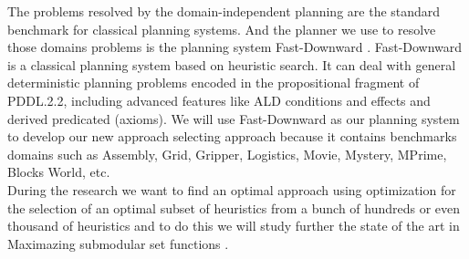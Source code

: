 \documentclass[a4paper,12pt]{article}
\begin{document}
The problems resolved by the domain-independent planning are the standard benchmark for classical planning systems. And the planner we use to resolve those domains problems is the planning system Fast-Downward \citep{helmert2006fast}. Fast-Downward is a classical planning system based on heuristic search. It can deal with general deterministic planning problems encoded in the propositional fragment of PDDL.2.2, including advanced features like ALD conditions and effects and derived predicated (axioms). We will use Fast-Downward as our planning system to develop our new approach selecting approach because it contains benchmarks domains such as Assembly, Grid, Gripper, Logistics, Movie, Mystery, MPrime, Blocks World, etc.\\

During the research we want to find an optimal approach using optimization for the selection of an optimal subset of heuristics from a bunch of hundreds or even thousand of heuristics and to do this we will study further the state of the art in Maximazing submodular set functions \citep{nemhauser1978analysis}.\\
\newpage
\end{document}

